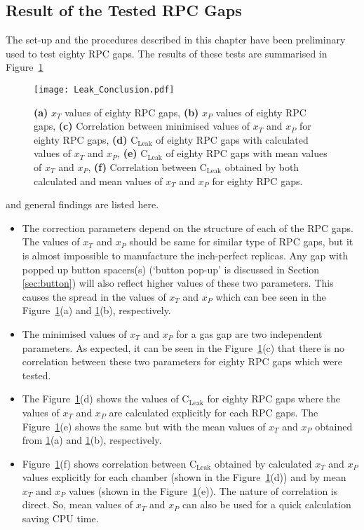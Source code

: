 \subsection{Result of the Tested RPC Gaps}
The set-up and the procedures described in this chapter have been preliminary used to test eighty RPC gaps. The results of these tests are summarised in Figure~\ref{fig:conclusion}
\begin{figure}[h]
  \centering
  \texttt{[image: Leak\_Conclusion.pdf]}
  \caption{\textbf{(a)} $x_T$ values of eighty RPC gaps, \textbf{(b)} $x_P$ values of eighty RPC gaps, \textbf{(c)} Correlation between minimised values of $x_T$ and $x_P$ for eighty RPC gaps, \textbf{(d)} $\textrm{C}_{\textrm{Leak}}$ of eighty RPC gaps with calculated values of $x_T$ and $x_P$, \textbf{(e)} $\textrm{C}_{\textrm{Leak}}$ of eighty RPC gaps with mean values of $x_T$ and $x_P$, \textbf{(f)} Correlation between $\textrm{C}_{\textrm{Leak}}$ obtained by both calculated and mean values of $x_T$ and $x_P$ for eighty RPC gaps.}
  \label{fig:conclusion}
\end{figure}
and general findings are listed here.
\begin{itemize} \itemsep -3pt
\item The correction parameters depend on the structure of each of the RPC gaps. The values of $x_T$ and $x_P$ should be same for similar type of RPC gaps, but it is almost impossible to manufacture the inch-perfect replicas. Any gap with popped up button spacers(s) (`button pop-up' is discussed in Section \ref{sec:button}) will also reflect higher values of these two parameters. This causes the spread in the values of $x_T$ and $x_P$ which can bee seen in the Figure~\ref{fig:conclusion}(a) and \ref{fig:conclusion}(b), respectively.
\item The minimised values of $x_T$ and $x_P$ for a gas gap are two independent parameters. As expected, it can be seen in the Figure~\ref{fig:conclusion}(c) that there is no correlation between these two parameters for eighty RPC gaps which were tested.
\item The Figure~\ref{fig:conclusion}(d) shows the values of $\textrm{C}_{\textrm{Leak}}$ for eighty RPC gaps where the values of $x_T$ and $x_P$ are calculated explicitly for each RPC gaps. The Figure~\ref{fig:conclusion}(e) shows the same but with the mean values of $x_T$ and $x_P$ obtained from \ref{fig:conclusion}(a) and \ref{fig:conclusion}(b), respectively.
\item Figure~\ref{fig:conclusion}(f) shows correlation between $\textrm{C}_{\textrm{Leak}}$ obtained by calculated $x_T$ and $x_P$ values explicitly for each chamber (shown in the Figure~\ref{fig:conclusion}(d)) and by mean $x_T$ and $x_P$ values (shown in the Figure~\ref{fig:conclusion}(e)). The nature of correlation is direct. So, mean values of $x_T$ and $x_P$ can also be used for a quick calculation saving CPU time.
\end{itemize}

